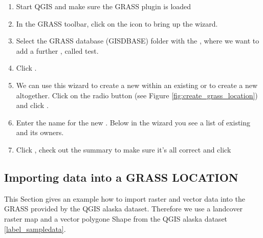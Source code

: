 \begin{enumerate}
  \item Start QGIS and make sure the GRASS plugin is loaded
  \item In the GRASS toolbar, click on the 
   icon to bring up the 
   wizard.
  \item Select the GRASS database (GISDBASE) folder  
  with the , where we want to add a further 
  , called test.
  \item Click . 
  \item We can use this wizard to create a new  within an 
  existing  or to create a new  
  altogether. Click on the radio button  
  (see Figure \ref{fig:create_grass_location}) and click .
  \item Enter the name  for the new . Below 
  in the wizard you see a list of existing  and its owners.
  \item Click , check out the summary to make sure it's all 
  correct and click  
\end{enumerate}

\subsection{Importing data into a GRASS LOCATION}\label{sec:import_loc_data}

This Section gives an example how to import raster and vector data into the 
 GRASS  provided by the QGIS alaska 
dataset. Therefore we use a landcover raster map  
and a vector polygone Shape  from the QGIS alaska 
dataset \ref{label_sampledata}.

